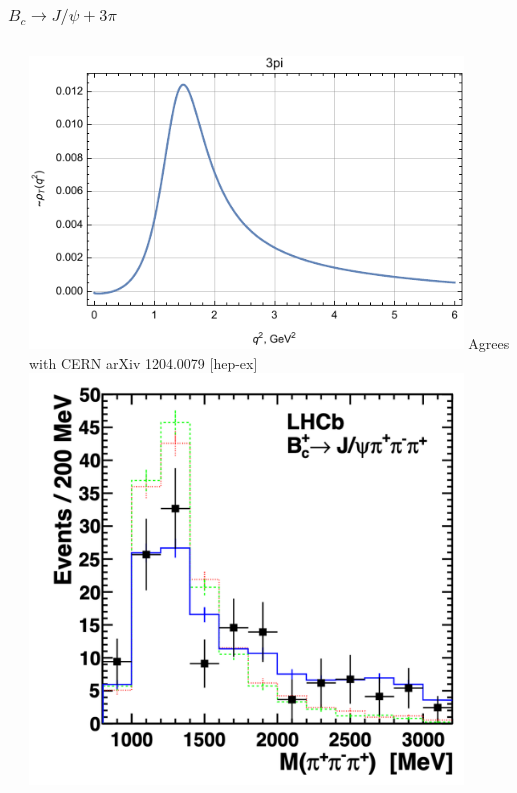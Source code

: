 \documentclass{beamer}
\begin{document}
\begin{frame}
  \frametitle{$B_c\to J/\psi + 3\pi$}
  \begin{columns}
    \begin{column}{0.5\textwidth}
    \end{column}
    \begin{column}{0.5\textwidth}
      \includegraphics[width=0.9\textwidth]{figs/rhoT_3pi_q2}
      Agrees with CERN arXiv 1204.0079 [hep-ex]
      \includegraphics[width = 0.9\textwidth]{1204_0079_Fig2}
    \end{column}
  \end{columns}
\end{frame}
\end{document}
